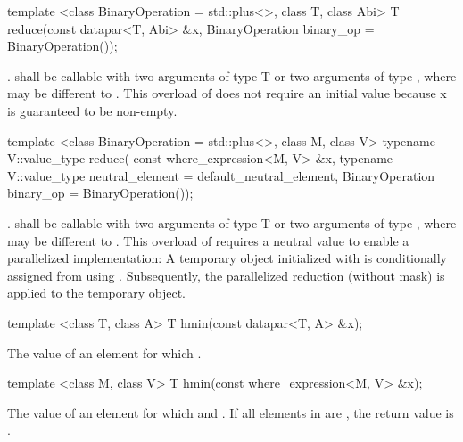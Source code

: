 \begin{itemdecl}
template <class BinaryOperation = std::plus<>, class T, class Abi>
T reduce(const datapar<T, Abi> &x, BinaryOperation binary_op = BinaryOperation());
\end{itemdecl}
\begin{itemdescr}
  \pnum\returns {} \foralli.
  \pnum\requires {} shall be callable with two arguments of type \type T or two arguments of type \datapar[<T, A1>], where  may be different to .
  \pnum\realnote This overload of  does not require an initial value because \code x is guaranteed to be non-empty.
\end{itemdescr}

\begin{itemdecl}
template <class BinaryOperation = std::plus<>, class M, class V>
typename V::value_type reduce(
    const where_expression<M, V> &x,
    typename V::value_type neutral_element = default_neutral_element,
    BinaryOperation binary_op = BinaryOperation());
\end{itemdecl}
\begin{itemdescr}
  \pnum\returns {} .
  \pnum\requires {} shall be callable with two arguments of type \type T or two arguments of type \datapar[<T, A1>], where  may be different to .
  \pnum\realnote This overload of  requires a neutral value to enable a parallelized implementation:
  A temporary \datapar object initialized with  is conditionally assigned from  using .
  Subsequently, the parallelized reduction (without mask) is applied to the temporary object.
\end{itemdescr}

\begin{itemdecl}
template <class T, class A> T hmin(const datapar<T, A> &x);
\end{itemdecl}
\begin{itemdescr}
  \pnum\returns The value of an element  for which  \foralli.
\end{itemdescr}

\begin{itemdecl}
template <class M, class V> T hmin(const where_expression<M, V> &x);
\end{itemdecl}
\begin{itemdescr}
  \pnum\returns The value of an element  for which  and  \foralli.
  \pnum\remarks If all elements in  are \false, the return value is .
\end{itemdescr}


